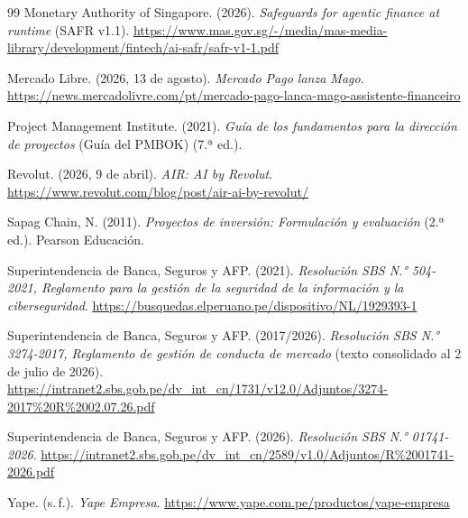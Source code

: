 \documentclass[11pt]{article}
\begin{document}
\begin{thebibliography}{99}
Monetary Authority of Singapore. (2026). \textit{Safeguards for agentic finance at runtime} (SAFR v1.1). \url{https://www.mas.gov.sg/-/media/mas-media-library/development/fintech/ai-safr/safr-v1-1.pdf}

Mercado Libre. (2026, 13 de agosto). \textit{Mercado Pago lanza Mago}. \url{https://news.mercadolivre.com/pt/mercado-pago-lanca-mago-assistente-financeiro}

Project Management Institute. (2021). \textit{Guía de los fundamentos para la dirección de proyectos} (Guía del PMBOK) (7.ª ed.).

Revolut. (2026, 9 de abril). \textit{AIR: AI by Revolut}. \url{https://www.revolut.com/blog/post/air-ai-by-revolut/}

Sapag Chain, N. (2011). \textit{Proyectos de inversión: Formulación y evaluación} (2.ª ed.). Pearson Educación.

Superintendencia de Banca, Seguros y AFP. (2021). \textit{Resolución SBS N.° 504-2021, Reglamento para la gestión de la seguridad de la información y la ciberseguridad}. \url{https://busquedas.elperuano.pe/dispositivo/NL/1929393-1}

Superintendencia de Banca, Seguros y AFP. (2017/2026). \textit{Resolución SBS N.° 3274-2017, Reglamento de gestión de conducta de mercado} (texto consolidado al 2 de julio de 2026). \url{https://intranet2.sbs.gob.pe/dv_int_cn/1731/v12.0/Adjuntos/3274-2017%20R%2002.07.26.pdf}

Superintendencia de Banca, Seguros y AFP. (2026). \textit{Resolución SBS N.° 01741-2026}. \url{https://intranet2.sbs.gob.pe/dv_int_cn/2589/v1.0/Adjuntos/R%2001741-2026.pdf}

Yape. (s.\,f.). \textit{Yape Empresa}. \url{https://www.yape.com.pe/productos/yape-empresa}
\end{thebibliography}
\end{document}
